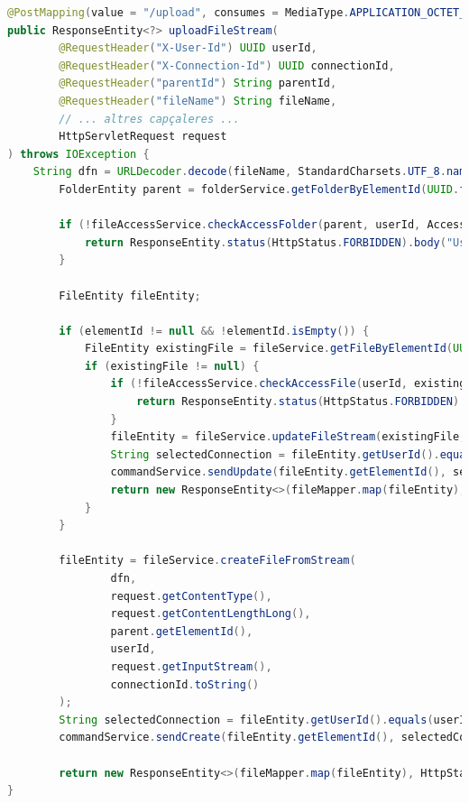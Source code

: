 \begin{lstlisting}[language=Java, caption={Endpoint per a la pujada de fitxers amb `InputStream` a `ElementController`}]
@PostMapping(value = "/upload", consumes = MediaType.APPLICATION_OCTET_STREAM_VALUE)
public ResponseEntity<?> uploadFileStream(
        @RequestHeader("X-User-Id") UUID userId,
        @RequestHeader("X-Connection-Id") UUID connectionId,
        @RequestHeader("parentId") String parentId,
        @RequestHeader("fileName") String fileName,
        // ... altres capçaleres ...
        HttpServletRequest request
) throws IOException {
    String dfn = URLDecoder.decode(fileName, StandardCharsets.UTF_8.name());
        FolderEntity parent = folderService.getFolderByElementId(UUID.fromString(parentId), false);

        if (!fileAccessService.checkAccessFolder(parent, userId, AccessType.WRITE)) {
            return ResponseEntity.status(HttpStatus.FORBIDDEN).body("User does not have access to this resource");
        }

        FileEntity fileEntity;

        if (elementId != null && !elementId.isEmpty()) {
            FileEntity existingFile = fileService.getFileByElementId(UUID.fromString(elementId), false);
            if (existingFile != null) {
                if (!fileAccessService.checkAccessFile(userId, existingFile.getElementId(), AccessType.WRITE)) {
                    return ResponseEntity.status(HttpStatus.FORBIDDEN).body("User does not have access to this resource");
                }
                fileEntity = fileService.updateFileStream(existingFile, dfn, request.getContentType(), request.getContentLengthLong(), request.getInputStream());
                String selectedConnection = fileEntity.getUserId().equals(userId) ? connectionId.toString() : null;
                commandService.sendUpdate(fileEntity.getElementId(), selectedConnection, fileEntity.getUserId().toString(), fileEntity.getParent(), fileService.getHash(fileEntity.getId()), fileEntity.getName(), "file");
                return new ResponseEntity<>(fileMapper.map(fileEntity), HttpStatus.OK);
            }
        }

        fileEntity = fileService.createFileFromStream(
                dfn,
                request.getContentType(),
                request.getContentLengthLong(),
                parent.getElementId(),
                userId,
                request.getInputStream(),
                connectionId.toString()
        );
        String selectedConnection = fileEntity.getUserId().equals(userId) ? connectionId.toString() : null;
        commandService.sendCreate(fileEntity.getElementId(), selectedConnection, fileEntity.getUserId().toString(), fileEntity.getParent(), fileService.getHash(fileEntity.getId()), fileEntity.getName(), "file");

        return new ResponseEntity<>(fileMapper.map(fileEntity), HttpStatus.CREATED);
}
\end{lstlisting}

